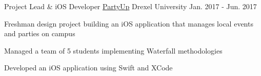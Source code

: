 \begin{cventries}
  \cventry
    {Project Lead \& iOS Developer} %
    {\href{https://github.com/AbirRazzak/partyup-final}{PartyUp}} %
    {Drexel University} %
    {Jan. 2017 - Jun. 2017} %
    {
      \begin{cvitems} %
        \item Freshman design project building an iOS application that manages local events and parties on campus
        \item Managed a team of 5 students implementing Waterfall methodologies
        \item Developed an iOS application using Swift and XCode
      \end{cvitems}
    }

\end{cventries}